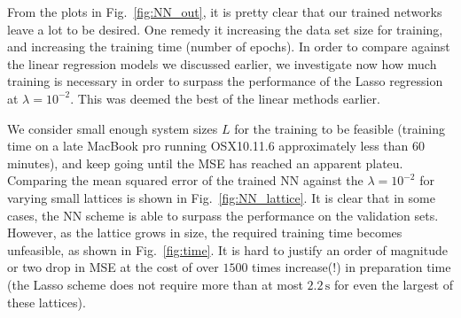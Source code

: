 \documentclass[a4paper, twocolumn]{article}
\newcommand{\fig}[1]{Fig.\ \ref{fig:#1}}
\begin{document}

\begin{figure}
\end{figure}

From the plots in \fig{NN_out}, it is pretty clear that our trained networks leave a lot to be desired. One remedy it increasing the data set size for training, and increasing the training time (number of epochs). In order to compare against the linear regression models we discussed earlier, we investigate now how much training is necessary in order to surpass the performance of the Lasso regression at $\lambda=10^{-2}$. This was deemed the best of the linear methods earlier. 

We consider small enough system sizes $L$ for the training to be feasible (training time on a late MacBook pro running OSX10.11.6 approximately less than 60 minutes), and keep going until the MSE has reached an apparent plateu. Comparing the mean squared error of the trained NN against the $\lambda=10^{-2}$ for varying small lattices is shown in \fig{NN_lattice}. It is clear that in some cases, the NN scheme is able to surpass the performance on the validation sets. However, as the lattice grows in size, the required training time becomes unfeasible, as shown in \fig{time}. It is hard to justify an order of magnitude or two drop in MSE at the cost of over $1500$ times increase(!) in preparation time (the Lasso scheme does not require more than at most $2.2\,\text{s}$ for even the largest of these lattices). 
\end{document}
